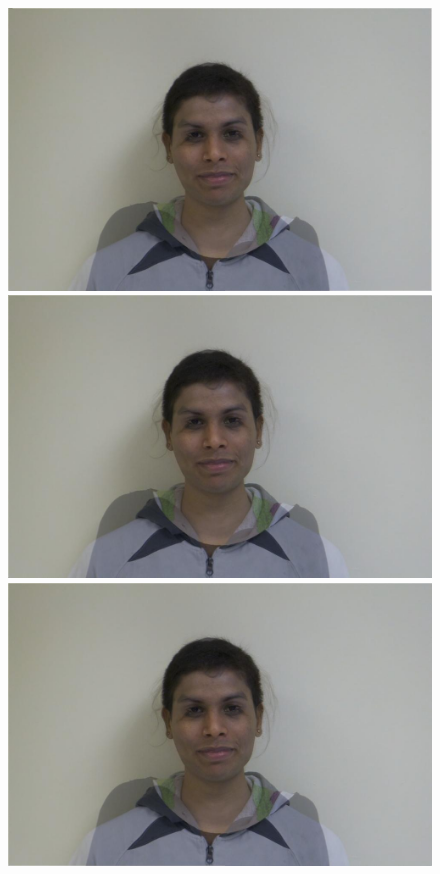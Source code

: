 \documentclass[11pt]{article}
\begin{document}
\begin{figure}[H]
\begin{center}
\includegraphics[scale=0.06]{figs/frames/morph_steinkirch_tangatur_34.jpg} 
\includegraphics[scale=0.06]{figs/frames/morph_steinkirch_tangatur_35.jpg} 
\includegraphics[scale=0.06]{figs/frames/morph_steinkirch_tangatur_36.jpg}  

\end{center}
\end{figure}
\end{document}
